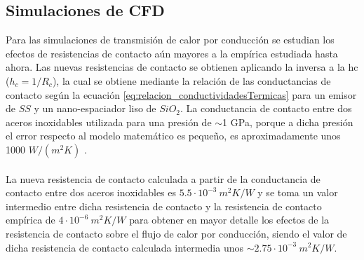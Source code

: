\subsection{Simulaciones de CFD}
Para las simulaciones de transmisión de calor por conducción se estudian los efectos de resistencias de contacto aún mayores a la empírica estudiada hasta ahora. Las nuevas resistencias de contacto se obtienen aplicando la inversa a la \gls{hc} ($h_c=1/R_c$), la cual se obtiene mediante la relación de las conductancias de contacto según la ecuación \eqref{eq:relacion_conductividadesTermicas} para un emisor de $SS$ y un nano-espaciador liso de $SiO_2$. La conductancia de contacto entre dos aceros inoxidables utilizada para una presión de $\sim$1 GPa, porque a dicha presión el error respecto al modelo matemático es pequeño, es aproximadamente unos 1000 $W/(m^2 K)$ \cite{experimental_Rc_SS}.\\\\
La nueva resistencia de contacto calculada a partir de la conductancia de contacto entre dos aceros inoxidables es $5.5\cdot 10^{-3} \ m^2 K/W$ y se toma un valor intermedio entre dicha resistencia de contacto y la resistencia de contacto empírica de $4\cdot 10^{-6} \ m^2 K/W$ \cite{nf_TPV_Pillars_SiO2} para obtener en mayor detalle los efectos de la resistencia de contacto sobre el flujo de calor por conducción, siendo el valor de dicha resistencia de contacto calculada intermedia unos $\sim 2.75\cdot 10^{-3} \ m^2 K/W$.
\graphicspath{ {./figuras/Resultados/conduccion/pdf/} }
